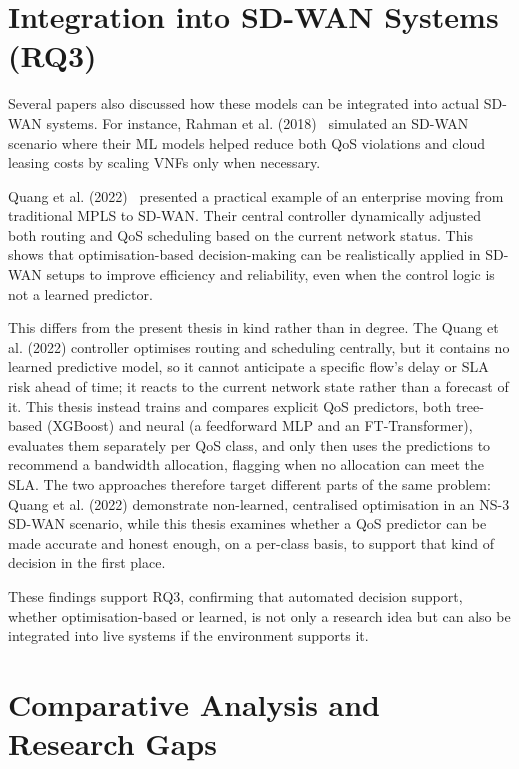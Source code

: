 \documentclass[a4paper,12pt]{Classes/RoboticsLaTeX}
\begin{document}
\section{Integration into SD-WAN Systems (RQ3)}

Several papers also discussed how these models can be integrated into actual SD-WAN systems. For instance, Rahman et al. (2018)~\cite{rahman2019autoscaling} simulated an SD-WAN scenario where their ML models helped reduce both QoS violations and cloud leasing costs by scaling VNFs only when necessary.

Quang et al. (2022)~\cite{quang2022routing} presented a practical example of an enterprise moving from traditional MPLS to SD-WAN. Their central controller dynamically adjusted both routing and QoS scheduling based on the current network status. This shows that optimisation-based decision-making can be realistically applied in SD-WAN setups to improve efficiency and reliability, even when the control logic is not a learned predictor.

This differs from the present thesis in kind rather than in degree. The Quang et al. (2022) controller optimises routing and scheduling centrally, but it contains no learned predictive model, so it cannot anticipate a specific flow's delay or SLA risk ahead of time; it reacts to the current network state rather than a forecast of it. This thesis instead trains and compares explicit QoS predictors, both tree-based (XGBoost) and neural (a feedforward MLP and an FT-Transformer), evaluates them separately per QoS class, and only then uses the predictions to recommend a bandwidth allocation, flagging when no allocation can meet the SLA. The two approaches therefore target different parts of the same problem: Quang et al. (2022) demonstrate non-learned, centralised optimisation in an NS-3 SD-WAN scenario, while this thesis examines whether a QoS predictor can be made accurate and honest enough, on a per-class basis, to support that kind of decision in the first place.

These findings support RQ3, confirming that automated decision support, whether optimisation-based or learned, is not only a research idea but can also be integrated into live systems if the environment supports it.

\section{Comparative Analysis and Research Gaps}
\label{sec:comparative-analysis}
\end{document}

